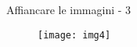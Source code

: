 \begin{frame}{Affiancare le immagini - 3}

\begin{figure}[H]
    \centering
    \texttt{[image: img4]}
\end{figure}

\end{frame}